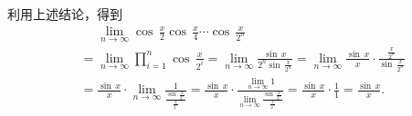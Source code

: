 \noindent 利用上述结论，得到
\begin{align}
    &\mathrel{\phantom{=}} \lim_{n \to \infty} \cos \, \frac{x}{2} \cos \, \frac{x}{4} \cdots \cos \, \frac{x}{2^n} \\
    &= \lim_{n \to \infty} \prod_{i=1}^n \cos \, \frac{x}{2^i} = \lim_{n \to \infty} \frac{\sin \, x}{2^{n} \sin \, \displaystyle\frac{x}{2^n}} = \lim_{n \to \infty} \frac{\sin \, x}{x} \cdot \frac{\displaystyle\frac{x}{2^n}}{\sin \, \displaystyle\frac{x}{2^n}} \\
    &= \frac{\sin \, x}{x} \cdot \lim_{n \to \infty} \displaystyle \frac{1}{\displaystyle\frac{\sin \, \displaystyle\frac{x}{2^n}}{\displaystyle\frac{x}{2^n}}} = \frac{\sin \, x}{x} \cdot \frac{\displaystyle\lim_{n \to \infty} 1}{\displaystyle\lim_{n \to \infty} \displaystyle\frac{\sin \, \displaystyle\frac{x}{2^n}}{\displaystyle\frac{x}{2^n}}} = \displaystyle\frac{\sin \, x}{x} \cdot \displaystyle\frac{1}{1} = \frac{\sin \, x}{x}.
\end{align}

